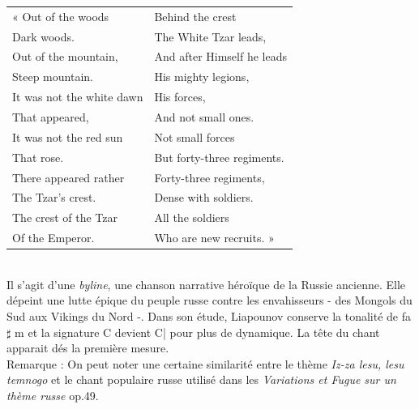 \begin{tabular}{ll}
\hspace{-3.9mm}« Out of the woods
&
Behind the crest
\\
  \quad{}Dark woods.
&
  \quad{}The White Tzar leads,
\\
Out of the mountain,
&
And after Himself he leads
\\
  \quad{}Steep mountain.
&
  \quad{}His mighty legions,
\\
It was not the white dawn
&
His forces,
\\
  \quad{}That appeared,
&
  \quad{}And not small ones.
\\
It was not the red sun
&
Not small forces
\\
  \quad{}That rose.
&
  \quad{}But forty-three regiments.
\\
There appeared rather
&
Forty-three regiments,
\\
  \quad{}The Tzar’s crest.
&
  \quad{}Dense with soldiers.
\\
The crest of the Tzar
&
All the soldiers
\\
  \quad{}Of the Emperor.
&
  \quad{}Who are new recruits. »
\end{tabular}\\

Il s'agit d'une \emph{byline}, une chanson narrative héroïque de la Russie ancienne. Elle dépeint une lutte épique du peuple russe contre les envahisseurs - des Mongols du Sud aux Vikings du Nord -. Dans son étude, Liapounov conserve la tonalité de fa$\sharp$ m et la signature C devient C\hspace{-2mm}| pour plus de dynamique. La tête du chant apparait dés la première mesure.\\

Remarque : On peut noter une certaine similarité entre le thème \emph{Iz-za lesu, lesu temnogo} et le chant populaire russe utilisé dans les \emph{Variations et Fugue sur un thème russe} op.49.

